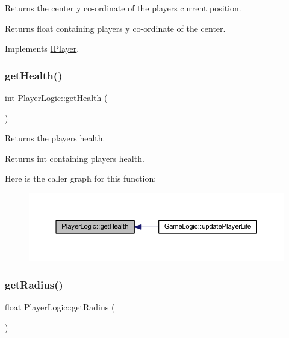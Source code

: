 Returns the center y co-\/ordinate of the player\textquotesingle{}s current position. 

\begin{DoxyReturn}{Returns}
float containing players y co-\/ordinate of the center. 
\end{DoxyReturn}


Implements \hyperlink{class_i_player_a6c5a2ec396245f91bee3e00ab089d57e}{I\+Player}.

\mbox{\label{class_player_logic_aa13b870627a1d38cd1c633ac8012e5af}} 
\subsubsection{\texorpdfstring{get\+Health()}{getHealth()}}
{\footnotesize\ttfamily int Player\+Logic\+::get\+Health (\begin{DoxyParamCaption}{ }\end{DoxyParamCaption})}



Returns the players health. 

\begin{DoxyReturn}{Returns}
int containing player\textquotesingle{}s health. 
\end{DoxyReturn}
Here is the caller graph for this function\+:
\nopagebreak
\begin{figure}[H]
\begin{center}
\leavevmode
\includegraphics[width=350pt]{class_player_logic_aa13b870627a1d38cd1c633ac8012e5af_icgraph}
\end{center}
\end{figure}
\mbox{\label{class_player_logic_a2ca2c54d1e07bfc40a08b5c55403af3a}} 
\subsubsection{\texorpdfstring{get\+Radius()}{getRadius()}}
{\footnotesize\ttfamily float Player\+Logic\+::get\+Radius (\begin{DoxyParamCaption}{ }\end{DoxyParamCaption})\hspace{0.3cm}{\ttfamily [virtual]}}



